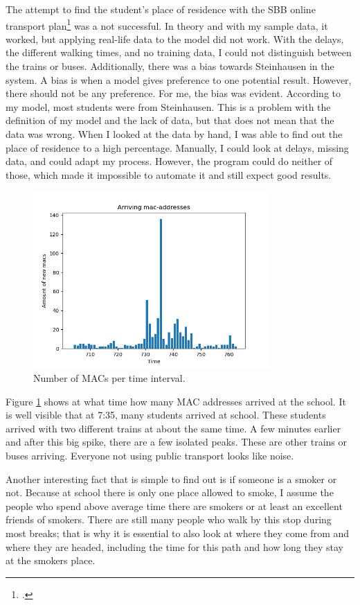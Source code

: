 \documentclass[paper=a4, fontsize=11pt]{article}
\begin{document}
The attempt to find the student's place of residence with the SBB online transport plan\footcite{sbbonlinefahrplan} was a not successful. In theory and with my sample data, it worked, but applying real-life data to the model did not work. With the delays, the different walking times, and no training data, I could not distinguish between the trains or buses. Additionally, there was a bias towards Steinhausen in the system. A bias is when a model gives preference to one potential result. However, there should not be any preference. For me, the bias was evident. According to my model, most students were from Steinhausen. This is a problem with the definition of my model and the lack of data, but that does not mean that the data was wrong. When I looked at the data by hand, I was able to find out the place of residence to a high percentage. Manually, I could look at delays, missing data, and could adapt my process. However, the program could do neither of those, which made it impossible to automate it and still expect good results.

\begin{figure}
\centering
\includegraphics [width = 9cm]{images/fridaymorning7-8v2.png}
\caption{Number of MACs per time interval.\label{fig:macarrive}}
\end{figure}



Figure \ref{fig:macarrive} shows at what time how many MAC addresses arrived at the school. It is well visible that at 7:35, many students arrived at school. These students arrived with two different trains at about the same time. A few minutes earlier and after this big spike, there are a few isolated peaks. These are other trains or buses arriving. Everyone not using public transport looks like noise.

Another interesting fact that is simple to find out is if someone is a smoker or not. Because at school there is only one place allowed to smoke, I assume the people who spend above average time there are smokers or at least an excellent friends of smokers. There are still many people who walk by this stop during most breaks; that is why it is essential to also look at where they come from and where they are headed, including the time for this path and how long they stay at the smokers place.
\end{document}
